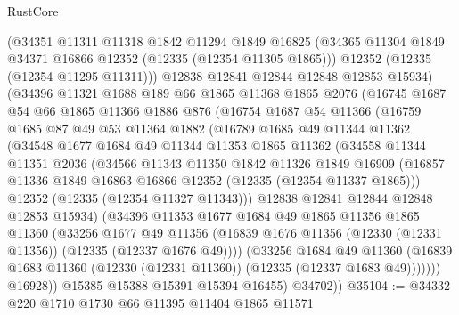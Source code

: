 \begin{lexlean}{RustCore}
\begin{coremodule}
        (@34351
          @11311
          @11318
          @1842
          @11294
          @1849
          @16825
          (@34365 @11304 @1849 @34371 @16866 @12352 (@12335 (@12354 @11305 @1865)))
          @12352
          (@12335 (@12354 @11295 @11311)))
        @12838
        @12841
        @12844
        @12848
        @12853
        @15934)
      (@34396
        @11321
        @1688
        @189
        @66
        @1865
        @11368
        @1865
        @2076
        (@16745
          @1687
          @54
          @66
          @1865
          @11366
          @1886
          @876
          (@16754
            @1687
            @54
            @11366
            (@16759
              @1685
              @87
              @49
              @53
              @11364
              @1882
              (@16789
                @1685
                @49
                @11344
                @11362
                (@34548
                  @1677
                  @1684
                  @49
                  @11344
                  @11353
                  @1865
                  @11362
                  (@34558
                    @11344
                    @11351
                    @2036
                    (@34566
                      @11343
                      @11350
                      @1842
                      @11326
                      @1849
                      @16909
                      (@16857 @11336 @1849 @16863 @16866 @12352 (@12335 (@12354 @11337 @1865)))
                      @12352
                      (@12335 (@12354 @11327 @11343)))
                    @12838
                    @12841
                    @12844
                    @12848
                    @12853
                    @15934)
                  (@34396
                    @11353
                    @1677
                    @1684
                    @49
                    @1865
                    @11356
                    @1865
                    @11360
                    (@33256
                      @1677
                      @49
                      @11356
                      (@16839 @1676 @11356 (@12330 (@12331 @11356)) (@12335 (@12337 @1676 @49))))
                    (@33256
                      @1684
                      @49
                      @11360
                      (@16839 @1683 @11360 (@12330 (@12331 @11360)) (@12335 (@12337 @1683 @49)))))))
              @16928))
          @15385
          @15388
          @15391
          @15394
          @16455)
        @34702))
@35104 := @34332 @220 @1710 @1730 @66 @11395 @11404 @1865 @11571

\end{coremodule}
\end{lexlean}
